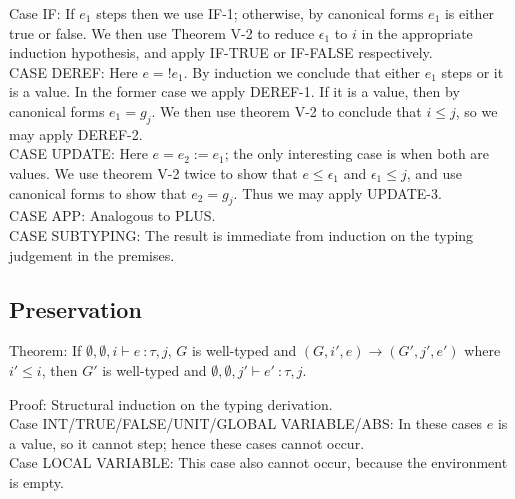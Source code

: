 \documentclass{article}
\begin{document}
Case IF: If $e_1$ steps then we use IF-1; otherwise, by canonical forms $e_1$ is either true or false. We then use Theorem V-2 to reduce $\epsilon_1$ to $i$ in the appropriate induction hypothesis, and apply IF-TRUE or IF-FALSE respectively.
\\

CASE DEREF: Here $e = !e_1$. By induction we conclude that either $e_1$ steps or it is a value. In the former case we apply DEREF-1. If it is a value, then by canonical forms $e_1 = g_j$. We then use theorem V-2 to conclude that $i \leq j$, so we may apply DEREF-2.
\\

CASE UPDATE: Here $e = e_2 := e_1$; the only interesting case is when both are values. We use theorem V-2 twice to show that $e \leq \epsilon_1$ and $\epsilon_1 \leq j$, and use canonical forms to show that $e_2 = g_j$. Thus we may apply UPDATE-3.
\\

CASE APP: Analogous to PLUS.
\\

CASE SUBTYPING: The result is immediate from induction on the typing judgement in the premises.


\subsection*{Preservation}
Theorem: If $\emptyset, \emptyset, i \vdash e\ \colon \tau, j$, $G$ is well-typed and $(G, i', e) \rightarrow (G', j', e')$ where $i' \leq i$, then $G'$ is well-typed and $\emptyset, \emptyset, j' \vdash e'\ \colon \tau, j$.

\noindent Proof: Structural induction on the typing derivation.
\\

Case INT/TRUE/FALSE/UNIT/GLOBAL VARIABLE/ABS: In these cases $e$ is a value, so it cannot step; hence these cases cannot occur.
\\

Case LOCAL VARIABLE: This case also cannot occur, because the environment is empty.
\\
\end{document}
